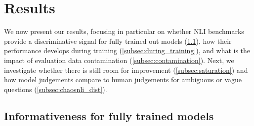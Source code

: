 \section{Results}

We now present our results, focusing in particular on whether NLI benchmarks provide a discriminative signal for fully trained out models (\cref{subsec:fully_trained}), how their performance develops during training (\cref{subsec:during_training}), and what is the impact of evaluation data contamination (\cref{subsec:contamination}). 
Next, we investigate whether there is still room for improvement (\cref{subsec:saturation}) and how model judgements compare to human judgements for ambiguous or vague questions (\cref{subsec:chaosnli_dist}).

\subsection{Informativeness for fully trained models}\label{subsec:fully_trained}

